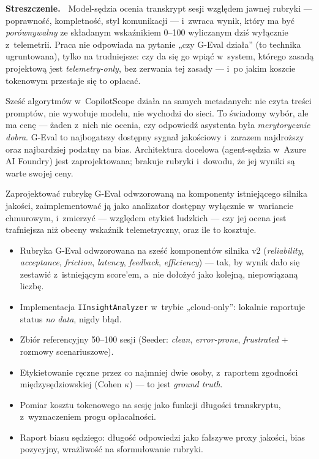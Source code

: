\documentclass[11pt,a4paper]{article}
\newcommand{\blok}[1]{\vspace{0.2em}\noindent{\bfseries\color{csblue}#1}\par\nopagebreak}
\newenvironment{streszczenie}%
  {\vspace{-0.7em}\begin{shaded}\noindent\textbf{Streszczenie.\ }}%
  {\end{shaded}\vspace{-0.5em}}
\begin{document}
\begin{streszczenie}
Model-sędzia ocenia transkrypt sesji względem jawnej rubryki --- poprawność,
kompletność, styl komunikacji --- i~zwraca wynik, który ma być
\emph{porównywalny} ze składanym wskaźnikiem 0--100 wyliczanym dziś wyłącznie
z~telemetrii. Praca nie odpowiada na pytanie „czy G-Eval działa'' (to technika
ugruntowana), tylko na trudniejsze: czy da się go wpiąć w~system, którego
zasadą projektową jest \emph{telemetry-only}, bez zerwania tej zasady --- i~po
jakim koszcie tokenowym przestaje się to opłacać.
\end{streszczenie}

\blok{Kontekst i motywacja}
Sześć algorytmów w~CopilotScope działa na samych metadanych: nie czyta treści
promptów, nie wywołuje modelu, nie wychodzi do sieci. To świadomy wybór, ale ma
cenę --- żaden z~nich nie ocenia, czy odpowiedź asystenta była
\emph{merytorycznie dobra}. G-Eval to najbogatszy dostępny sygnał jakościowy
i~zarazem najdroższy oraz najbardziej podatny na bias. Architektura docelowa
(agent-sędzia w~Azure AI Foundry) jest zaprojektowana; brakuje rubryki i~dowodu,
że jej wyniki są warte swojej ceny.

\blok{Cel pracy}
Zaprojektować rubrykę G-Eval odwzorowaną na komponenty istniejącego silnika
jakości, zaimplementować ją jako analizator dostępny wyłącznie w~wariancie
chmurowym, i~zmierzyć --- względem etykiet ludzkich --- czy jej ocena jest
trafniejsza niż obecny wskaźnik telemetryczny, oraz ile to kosztuje.

\blok{Zakres prac}
\begin{itemize}
  \item Rubryka G-Eval odwzorowana na sześć komponentów silnika v2
        (\emph{reliability}, \emph{acceptance}, \emph{friction}, \emph{latency},
        \emph{feedback}, \emph{efficiency}) --- tak, by wynik dało się zestawić
        z~istniejącym score'em, a~nie dołożyć jako kolejną, niepowiązaną liczbę.
  \item Implementacja \texttt{IInsightAnalyzer} w~trybie „cloud-only'': lokalnie
        raportuje status \emph{no data}, nigdy błąd.
  \item Zbiór referencyjny 50--100 sesji (Seeder: \emph{clean}, \emph{error-prone},
        \emph{frustrated} + rozmowy scenariuszowe).
  \item Etykietowanie ręczne przez co najmniej dwie osoby, z~raportem zgodności
        międzysędziowskiej (Cohen $\kappa$) --- to jest \emph{ground truth}.
  \item Pomiar kosztu tokenowego na sesję jako funkcji długości transkryptu,
        z~wyznaczeniem progu opłacalności.
  \item Raport biasu sędziego: długość odpowiedzi jako fałszywe proxy jakości,
        bias pozycyjny, wrażliwość na sformułowanie rubryki.
\end{itemize}
\end{document}
